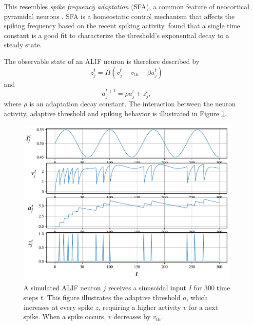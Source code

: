             This resembles \emph{spike frequency adaptation} (SFA), a common feature of neocortical pyramidal neurons \citep{benda2003universal}.
            SFA is a homeostatic control mechanism that affects the spiking frequency based on the recent spiking activity.
            \citet{ahmed1998estimates} found that a single time constant is a good fit to characterize the threshold's exponential decay to a steady state.

            The observable state of an ALIF neuron is therefore described by
            \begin{equation}\label{eq:alifZ}
            z^t_j = H\left(v_j^t - v_\text{th} - \beta a^t_j\right)
            \end{equation}
            and
            \begin{equation}\label{eq:alifA}
            a^{t+1}_j = \rho a^t_j + z^t_j,
            \end{equation}
            where $\rho$ is an adaptation decay constant.
            The interaction between the neuron activity, adaptive threshold and spiking behavior is illustrated in Figure \ref{fig:simplealif}.

            \begin{figure}[!ht]
                \centering
                \includegraphics[width=\linewidth]{gfx/simplealif}
                \caption[ALIF neuron simulation.]{A simulated ALIF neuron $j$ receives a sinusoidal input $I$ for 300 time steps $t$. This figure illustrates the adaptive threshold $a$, which increases at every spike $z$, requiring a higher activity $v$ for a next spike. When a spike occurs, $v$ decreases by $v_\text{th}$.}
                \label{fig:simplealif}
            \end{figure}

